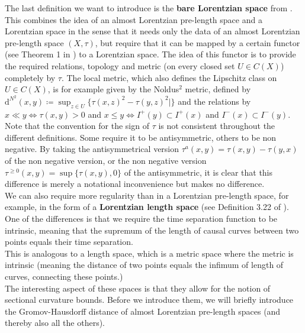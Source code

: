\documentclass[11pt, a4paper]{article} %
\newcommand{\dd}{\text{d}} %
\theoremstyle{plain} %
\newcommand{\mDef}{\coloneqq }
\begin{document}
The last definition we want to introduce is the \textbf{bare Lorentzian space} from \cite{muller2024maximality}. This combines the idea of an almost Lorentzian pre-length space and a Lorentzian space in the sense that it needs only the data of an almost Lorentzian pre-length space $(X,\tau)$, but require that it can be mapped by a certain functor (see Theorem 1 in \cite{muller2024maximality}) to a Lorentzian space. The idea of this functor is to provide the required relations, topology and metric (on every closed set $U\in C(X)$) completely by $\tau$. The local metric, which also defines the Lipschitz class on $U\in C(X)$, is for example given by the Noldus$^2$ metric, defined by $\dd^{N^2} (x,y) \mDef \sup_{z\in U}\{\tau(x,z)^2 - \tau(y,z)^2|\}$ and the relations by $x\ll y\iff \tau(x,y)>0$ and $x\leq y\iff I^+(y)\subset I^+(x)$ and $I^-(x)\subset I^-(y)$.
\\
Note that the convention for the sign of $\tau$ is not consistent throughout the different definitions. Some require it to be antisymmetric, others to be non negative. By taking the antisymmetrical version $\tau^a(x,y) = \tau(x,y) - \tau(y,x)$ of the non negative version, or the non negative version $\tau^{\geq 0}(x,y) = \sup\{\tau(x,y),0\}$ of the antisymmetric, it is clear that this difference is merely a notational inconvenience but makes no difference.\\
We can also require more regularity than in a Lorentzian pre-length space, for example, in the form of a \textbf{Lorentzian length space} (see Definition 3.22 of \cite{kunzinger2018lorentz}). One of the differences is that we require the time separation function to be intrinsic, meaning that the supremum of the length of causal curves between two points equals their time separation. \\
This is analogous to a length space, which is a metric space where the metric is intrinsic (meaning the distance of two points equals the infimum of length of curves, connecting these points.)\\
The interesting aspect of these spaces is that they allow for the notion of sectional curvature bounds. Before we introduce them, we will briefly introduce the Gromov-Hausdorff distance of almost Lorentzian pre-length spaces (and thereby also all the others).
\end{document}

